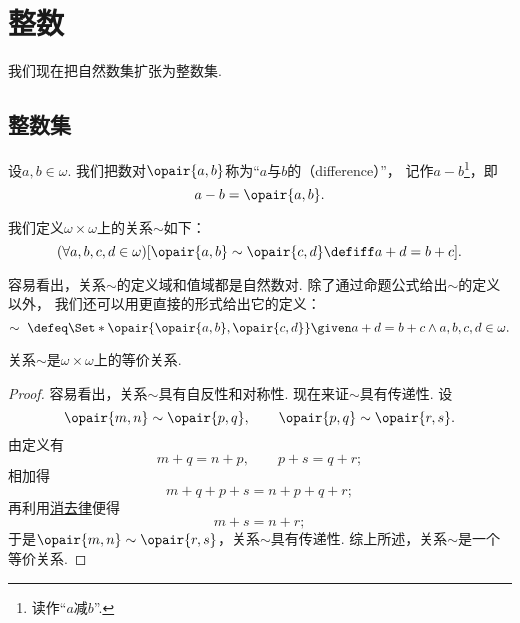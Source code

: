 \section{整数}
我们现在把自然数集扩张为整数集.
\subsection{整数集}
设\(a,b\in\omega\).
我们把数对\(\opair{a,b}\)称为“\(a\)与\(b\)的（difference）”，
记作\(a-b\)\footnote{读作“\(a\)减\(b\)”.}，即\begin{equation*}
	a-b = \opair{a,b}.
\end{equation*}

\begin{definition}\label{definition:集合论.自然数的差的等价关系}
我们定义\(\omega\times\omega\)上的关系\(\sim\)如下：
\begin{equation*}
	(\forall a,b,c,d \in \omega)
	[
		\opair{a,b} \sim \opair{c,d}
		\defiff
		a+d=b+c
	].
\end{equation*}
\end{definition}

容易看出，关系\(\sim\)的定义域和值域都是自然数对.
除了通过命题公式给出\(\sim\)的定义以外，
我们还可以用更直接的形式给出它的定义：
\begin{equation*}
	\sim\ \defeq \Set*{
		\opair{\opair{a,b},\opair{c,d}}
		\given
		a+d=b+c \land a,b,c,d\in\omega
	}.
\end{equation*}

\begin{theorem}
关系\(\sim\)是\(\omega\times\omega\)上的等价关系.
\begin{proof}
容易看出，关系\(\sim\)具有自反性和对称性.
现在来证\(\sim\)具有传递性.
设\begin{equation*}
	\opair{m,n}\sim\opair{p,q}, \qquad
	\opair{p,q}\sim\opair{r,s}.
\end{equation*}
由定义有\begin{equation*}
	m+q=n+p, \qquad
	p+s=q+r;
\end{equation*}
相加得\begin{equation*}
	m+q+p+s=n+p+q+r;
\end{equation*}
再利用\hyperref[theorem:集合论.自然数的消去律]{消去律}便得\begin{equation*}
	m+s=n+r;
\end{equation*}
于是\(\opair{m,n}\sim\opair{r,s}\)，关系\(\sim\)具有传递性.
综上所述，关系\(\sim\)是一个等价关系.
\end{proof}
\end{theorem}

